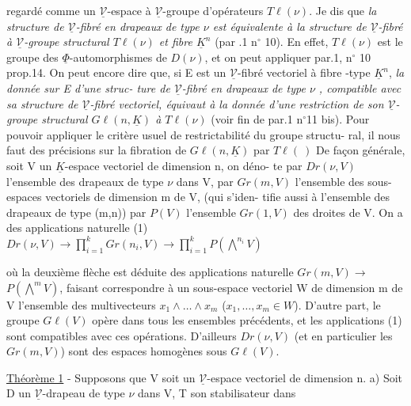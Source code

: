 regardé comme un $\underline{\mathcal{V}}$-espace à $\underline{\mathcal{V}}$-groupe d'opérateurs $T\ell(\nu)$. Je dis que
\emph{la structure de $\underline{\mathcal{V}}$-fibré en drapeaux de type $\nu$ est équivalente à la
structure de $\underline{\mathcal{V}}$-fibré à $\underline{\mathcal{V}}$-groupe structural $T\ell(\nu)$ et fibre $\underline{K}^n$} (par .1
n$^\circ$ 10). En effet, $T\ell(\nu)$ est le groupe des $\underline{\Phi}$-automorphismes de $D(\nu)$,
et on peut appliquer par.1, n$^\circ$ 10 prop.14. On peut encore dire que, si
E est un $\underline{\mathcal{V}}$-fibré vectoriel à fibre -type $\underline{K}^n$, \emph{la donnée sur E d'une struc-
ture de $\underline{\mathcal{V}}$-fibré en drapeaux de type $\nu$ , compatible avec sa structure de
$\underline{\mathcal{V}}$-fibré vectoriel, équivaut à la donnée d'une restriction de son $\underline{\mathcal{V}}$-
groupe structural $G\ell(n,\underline{K})$ à $T\ell(\nu)$} (voir fin de par.1 n$^\circ$11 bis). Pour
pouvoir appliquer le critère usuel de restrictabilité du groupe structu-
ral, il nous faut des précisions sur la fibration de $G\ell(n,\underline{K})$ par $T\ell( \ )$
De façon générale, soit V un $\underline{K}$-espace vectoriel de dimension n, on déno-
te par $Dr(\nu,V)$ l'ensemble des drapeaux de type $\nu$ dans V, par $Gr(m,V)$
l'ensemble des sous-espaces vectoriels de dimension m de V, (qui s'iden-
tifie aussi à l'ensemble des drapeaux de type (m,n)) par $P(V)$ l'ensemble
$Gr(1,V)$ des droites de V. On a des applications naturelle
(1) \quad $Dr(\nu,V) \longrightarrow \prod_{i=1}^k Gr(n_i,V) \longrightarrow \prod_{i=1}^k P(\overset{n_i}{\bigwedge} V)$

où la deuxième flèche est déduite des applications naturelle $Gr(m,V) \longrightarrow$
$P(\overset{m}{\bigwedge} V)$, faisant correspondre à un sous-espace vectoriel W de dimension
m de V l'ensemble des multivecteurs $x_1 \wedge \dots \wedge x_m$ ($x_1,\dots,x_m \in W$). D'autre
part, le groupe $G\ell(V)$ opère dans tous les ensembles précédents, et les
applications (1) sont compatibles avec ces opérations. D'ailleurs
$Dr(\nu,V)$ (et en particulier les $Gr(m,V)$) sont des espaces homogènes sous
$G\ell(V)$.

\underline{Théorème 1} - Supposons que V soit un $\underline{\mathcal{V}}$-espace vectoriel de dimension n.
a) Soit D un $\underline{\mathcal{V}}$-drapeau de type $\nu$ dans V, T son stabilisateur dans

\newpage


